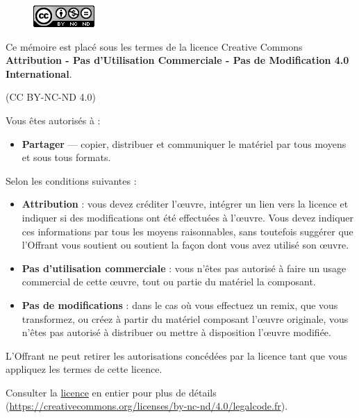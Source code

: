 \begin{figure}
    \centering
    \includegraphics{img/cc-icon}
    \label{fig:licence}
\end{figure}

\begin{center}
    Ce mémoire est placé sous les termes de la licence Creative Commons \textbf{Attribution - Pas d'Utilisation Commerciale - Pas de Modification 4.0 International}.
    
    (CC BY-NC-ND 4.0)
\end{center}

\bigskip

    Vous êtes autorisés à :
    \begin{itemize}
        \item \textbf{Partager} --- copier, distribuer et communiquer le matériel par tous moyens et sous tous formats.
    \end{itemize}

\bigskip

    Selon les conditions suivantes :
    \begin{itemize}
        \item \textbf{Attribution} : vous devez créditer l'\oe{}uvre, intégrer un lien vers la licence et indiquer si des modifications ont été effectuées à l'\oe{}uvre. Vous devez indiquer ces informations par tous les moyens raisonnables, sans toutefois suggérer que l'Offrant vous soutient ou soutient la façon dont vous avez utilisé son \oe{}uvre.
        \item \textbf{Pas d'utilisation commerciale} : vous n'êtes pas autorisé à faire un usage commercial de cette \oe{}uvre, tout ou partie du matériel la composant. 
        \item \textbf{Pas de modifications} : dans le cas où vous effectuez un remix, que vous transformez, ou créez à partir du matériel composant l'\oe{}uvre originale, vous n'êtes pas autorisé à distribuer ou mettre à disposition l'\oe{}uvre modifiée. 
    \end{itemize}

\bigskip

L'Offrant ne peut retirer les autorisations concédées par la licence tant que vous appliquez les termes de cette licence.

\bigskip

    Consulter la \href{https://creativecommons.org/licenses/by-nc-nd/4.0/legalcode.fr}{licence} en entier pour plus de détails (\url{https://creativecommons.org/licenses/by-nc-nd/4.0/legalcode.fr}). 